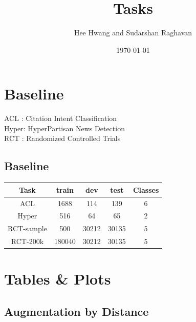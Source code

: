 \documentclass[11pt]{article}
\author{Hee Hwang and Sudarshan Raghavan}
\date{\today}
\title{Tasks}
\begin{document}
\maketitle






\section{Baseline}
\label{sec:org85b9722}
ACL  : Citation Intent Classification\\
Hyper: HyperPartisan News Detection\\
RCT  : Randomized Controlled Trials

\subsection{Baseline}
\label{sec:orgd55cbbc}
\begin{center}
\begin{tabular}{|c|c|c|c|c|}
\hline
Task & train & dev & test & Classes\\
\hline
ACL & 1688 & 114 & 139 & 6\\
\hline
Hyper & 516 & 64 & 65 & 2\\
\hline
RCT-sample & 500 & 30212 & 30135 & 5\\
\hline
RCT-200k & 180040 & 30212 & 30135 & 5\\
\hline
\end{tabular}
\end{center}




\section{Tables \& Plots}
\label{sec:orgf21a570}

\subsection{Augmentation by Distance}
\label{sec:org5891a92}
\end{document}
